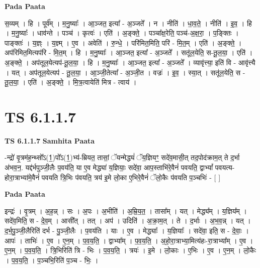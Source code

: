 \documentclass[17pt]{extarticle}
\begin{document}
\textbf{Pada Paata} \newline

स॒व्यम् । हि । पूर्व᳚म् । म॒नु॒ष्याः᳚ । आ॒ञ्जत॒ इत्या᳚ - अ॒ञ्जते᳚ । न । नीति॑ । धा॒व॒ते॒ । नीति॑ । इ॒व॒ । हि । म॒नु॒ष्याः᳚ । धाव॑न्ते । पञ्च॑ । कृत्वः॑ । एति॑ । अ॒ङ्क्ते॒ । पञ्चा᳚क्ष॒रेति॒ पञ्च॑-अ॒क्ष॒रा॒ । प॒ङ्क्तिः । पाङ्क्तः॑ । य॒ज्ञ्ः । य॒ज्ञ्म् । ए॒व । अवेति॑ । रु॒न्धे॒ । परि॑मित॒मिति॒ परि॑ - मि॒त॒म् । एति॑ । अ॒ङ्क्ते॒ । अप॑रिमित॒मित्यप॑रि - मि॒त॒म् । हि । म॒नु॒ष्याः᳚ । आ॒ञ्जत॒ इत्या᳚ - अ॒ञ्जते᳚ । सतू॑ल॒येति॒ स-तू॒ल॒या॒ । एति॑ । अ॒ङ्क्ते॒ । अप॑तूल॒येत्यप॑-तू॒ल॒या॒ । हि । म॒नु॒ष्याः᳚ । आ॒ञ्जत॒ इत्या᳚ - अ॒ञ्जते᳚ । व्यावृ॑त्त्या॒ इति॑ वि - आवृ॑त्त्यै । यत् । अप॑तूल॒येत्यप॑ - तू॒ल॒या॒ । आ॒ञ्जी॒तेत्या᳚ - अ॒ञ्जी॒त । वज्रः॑ । इ॒व॒ । स्या॒त् । सतू॑ल॒येति॒ स - तू॒ल॒या॒ । एति॑ । अ॒ङ्क्ते॒ । मि॒त्र॒त्वायेति॑ मित्र - त्वाय॑ ।  \newline




\section*{ TS 6.1.1.7 }

\textbf{TS 6.1.1.7 } \newline
\textbf{Samhita Paata} \newline

-न्द्रो॑ वृ॒त्रम॑ह॒न्थ्सो᳚ऽ(1॒)पो᳚ऽ(1॒)भ्य॑-म्रियत॒ तासां॒ ॅयन्मेद्ध्यं॑ ॅय॒ज्ञियꣳ॒॒ सदे॑व॒मासी॒त् तद॒पोद॑क्राम॒त् ते द॒र्भा अ॑भव॒न॒. यद्द॑र्भपुञ्जी॒लैः प॒वय॑ति॒ या ए॒व मेद्ध्या॑ य॒ज्ञियाः॒ सदे॑वा॒ आप॒स्ताभि॑रे॒वैनं॑ पवयति॒ द्वाभ्यां᳚ पवयत्य-होरा॒त्राभ्या॑मे॒वैनं॑ पवयति त्रि॒भिः प॑वयति॒ त्रय॑ इ॒मे लो॒का ए॒भिरे॒वैनं॑ ॅलो॒कैः प॑वयति प॒ञ्चभिः॑ - [  ] \newline

\textbf{Pada Paata} \newline

इन्द्रः॑ । वृ॒त्रम् । अ॒ह॒न्न् । सः । अ॒पः । अ॒भीति॑ । अ॒म्रि॒य॒त॒ । तासा᳚म् । यत् । मेद्ध्य᳚म् । य॒ज्ञिय᳚म् । सदे॑व॒मिति॒ स - दे॒व॒म् । आसी᳚त् । तत् । अप॑ । उदिति॑ । अ॒क्रा॒म॒त् । ते । द॒र्भाः । अ॒भ॒व॒न्न् । यत् । द॒र्भ॒पु॒ञ्जी॒लैरिति॑ दर्भ - पु॒ञ्जी॒लैः । प॒वय॑ति । याः । ए॒व । मेद्ध्याः᳚ । य॒ज्ञियाः᳚ । सदे॑वा॒ इति॒ स - दे॒वाः॒ । आपः॑ । ताभिः॑ । ए॒व । ए॒न॒म् । प॒व॒य॒ति॒ । द्वाभ्या᳚म् । प॒व॒य॒ति॒ । अ॒हो॒रा॒त्राभ्या॒मित्य॑हः-रा॒त्राभ्या᳚म् । ए॒व । ए॒न॒म् । प॒व॒य॒ति॒ । त्रि॒भिरिति॑ त्रि - भिः । प॒व॒य॒ति॒ । त्रयः॑ । इ॒मे । लो॒काः । ए॒भिः । ए॒व । ए॒न॒म् । लो॒कैः । प॒व॒य॒ति॒ । प॒ञ्चभि॒रिति॑ प॒ञ्च - भिः॒ ।  \newline
\end{document}
